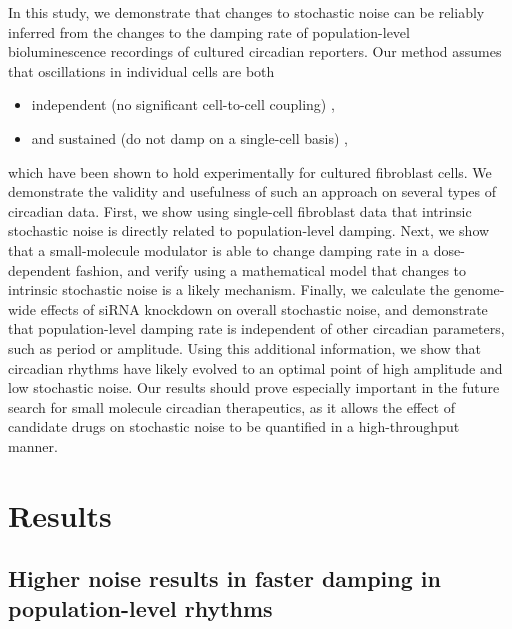 \documentclass[11pt, letterpaper]{article}
\begin{document}
In this study, we demonstrate that changes to stochastic noise can be reliably inferred from the changes to the damping rate of population-level bioluminescence recordings of cultured circadian reporters.
Our method assumes that oscillations in individual cells are both
\begin{itemize}
  \item independent (no significant cell-to-cell coupling) \cite{Noguchi2013, Guenthner2014},
  \item and sustained (do not damp on a single-cell basis) \cite{Welsh2004, Nagoshi2004},
\end{itemize}
which have been shown to hold experimentally for cultured fibroblast cells.
We demonstrate the validity and usefulness of such an approach on several types of circadian data.
First, we show using single-cell fibroblast data that intrinsic stochastic noise is directly related to population-level damping.
Next, we show that a small-molecule modulator is able to change damping rate in a dose-dependent fashion, and verify using a mathematical model that changes to intrinsic stochastic noise is a likely mechanism.
Finally, we calculate the genome-wide effects of siRNA knockdown on overall stochastic noise, and demonstrate that population-level damping rate is independent of other circadian parameters, such as period or amplitude.
Using this additional information, we show that circadian rhythms have likely evolved to an optimal point of high amplitude and low stochastic noise.
Our results should prove especially important in the future search for small molecule circadian therapeutics, as it allows the effect of candidate drugs on stochastic noise to be quantified in a high-throughput manner.


\section*{Results}

\subsection*{Higher noise results in faster damping in population-level rhythms}
\end{document}
